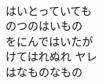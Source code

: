 \documentclass[10pt,b5j]{tarticle} %
\begin{document}
\begin{enumerate}
\begin{minipage}[c]{\blocksize}
        \vspace{\linespace}
        \item~\\
        はいとっていても\\
        のつのはいもの\\
        をにんではいたが\\
        けてはれぬれ ヤレ\\
        はなものなもの
    
    \end{minipage}
\end{enumerate} %
\end{document}
